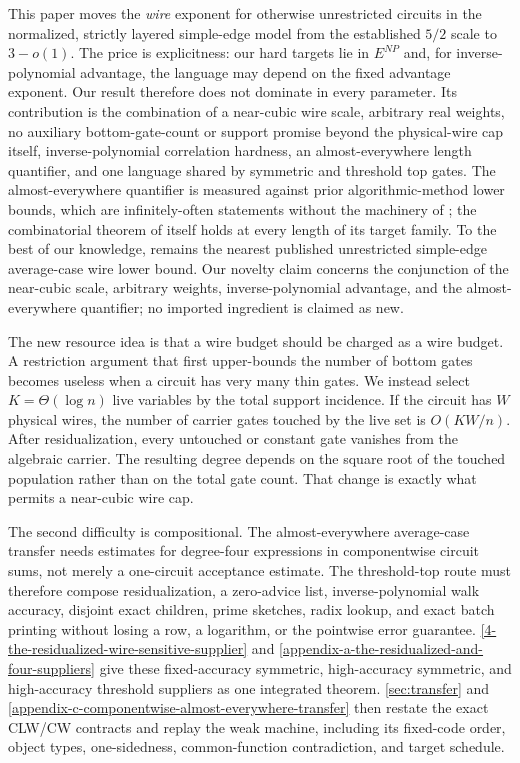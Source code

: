 \documentclass[11pt,letterpaper]{article}
\newcommand{\cref}[1]{\ref{#1}}
\theoremstyle{definition}
\theoremstyle{remark}
\begin{document}
This paper moves the \emph{wire} exponent for otherwise unrestricted
circuits in the normalized, strictly layered simple-edge model from the
established \(5/2\) scale to \(3-o(1)\). The price is explicitness: our
hard targets lie in \(E^{NP}\) and, for inverse-polynomial advantage,
the language may depend on the fixed advantage exponent. Our result
therefore does not dominate \cite{KW16} in every parameter. Its
contribution is the combination of a near-cubic wire scale, arbitrary
real weights, no auxiliary bottom-gate-count or support promise beyond
the physical-wire cap itself, inverse-polynomial correlation hardness,
an almost-everywhere length quantifier, and one language shared by
symmetric and threshold top gates. The almost-everywhere quantifier is
measured against prior algorithmic-method lower bounds, which are
infinitely-often statements without the machinery of \cite{CLW20}; the
combinatorial theorem of \cite{KW16} itself holds at every length of its
target family. To the best of our knowledge, \cite{KW16}
remains the nearest published unrestricted simple-edge average-case wire
lower bound. Our novelty claim concerns the conjunction of the near-cubic
scale, arbitrary weights, inverse-polynomial advantage, and the
almost-everywhere quantifier; no imported ingredient is claimed as new.

The new resource idea is that a wire budget should be charged as a wire
budget. A restriction argument that first upper-bounds the number of
bottom gates becomes useless when a circuit has very many thin gates. We
instead select \(K=\Theta(\log n)\) live variables by the total support
incidence. If the circuit has \(W\) physical wires, the number of
carrier gates touched by the live set is \(O(KW/n)\). After
residualization, every untouched or constant gate vanishes from the
algebraic carrier. The resulting degree depends on the square root of
the touched population rather than on the total gate count. That change
is exactly what permits a near-cubic wire cap.

The second difficulty is compositional. The almost-everywhere
average-case transfer needs estimates for degree-four expressions in
componentwise circuit sums, not merely a one-circuit acceptance
estimate. The threshold-top route must therefore compose
residualization, a zero-advice list, inverse-polynomial walk accuracy,
disjoint exact children, prime sketches, radix lookup, and exact batch
printing without losing a row, a logarithm, or the pointwise error
guarantee. \cref{4-the-residualized-wire-sensitive-supplier} and
\cref{appendix-a-the-residualized-and-four-suppliers} give these fixed-accuracy
symmetric, high-accuracy symmetric, and high-accuracy threshold
suppliers as one integrated theorem. \cref{sec:transfer} and
\cref{appendix-c-componentwise-almost-everywhere-transfer} then
restate the exact CLW/CW contracts and replay the weak machine,
including its fixed-code order, object types, one-sidedness,
common-function contradiction, and target schedule.
\end{document}
